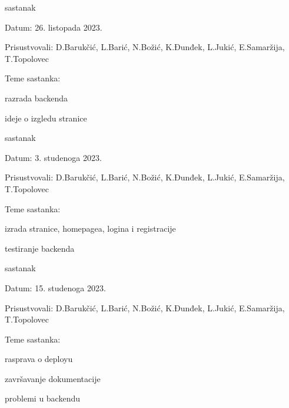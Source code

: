 \begin{packed_enum}
			\item  sastanak
			\item[] \begin{packed_item}
				\item Datum: 26. listopada 2023.
				\item Prisustvovali: D.Barukčić, L.Barić, N.Božić, K.Đunđek, L.Jukić, E.Samaržija, T.Topolovec
				\item Teme sastanka:
				\begin{packed_item}
					\item  razrada backenda 
					\item  ideje o izgledu stranice
					
				\end{packed_item}
			\end{packed_item}
			
			\item  sastanak
			\item[] \begin{packed_item}
				\item Datum: 3. studenoga 2023.
				\item Prisustvovali: D.Barukčić, L.Barić, N.Božić, K.Đunđek, L.Jukić, E.Samaržija, T.Topolovec
				\item Teme sastanka:
				\begin{packed_item}
					\item  izrada stranice, homepagea, logina i registracije
					\item  testiranje backenda
				\end{packed_item}
			\end{packed_item}
			
			\item  sastanak
			\item[] \begin{packed_item}
				\item Datum: 15. studenoga 2023.
				\item Prisustvovali: D.Barukčić, L.Barić, N.Božić, K.Đunđek, L.Jukić, E.Samaržija, T.Topolovec
				\item Teme sastanka:
				\begin{packed_item}
					\item  rasprava o deployu
					\item  završavanje dokumentacije
					\item  problemi u backendu 
				\end{packed_item}
			\end{packed_item}
			

\end{packed_enum}
